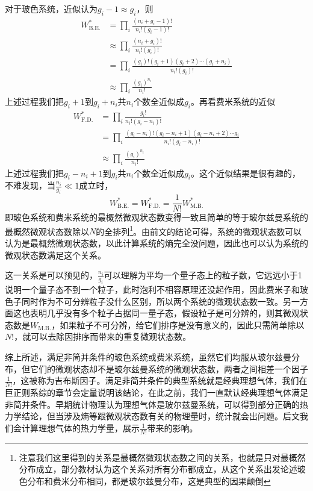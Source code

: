 \documentclass[../../main.tex]{subfiles}
\begin{document}
对于玻色系统，近似认为\(g_i-1\approx g_i\)，则
\begin{equation*}
    \begin{split}
        W_{\mathrm{B.E.}}^*&=\prod_i \frac{(n_i+g_i-1)!}{n_i !(g_i-1)!} \\
        &\approx \prod_i \frac{(n_i+g_i)!}{n_i !(g_i)!} \\
        &=\prod_i \frac{(g_i)!(g_i+1)(g_i+2)\cdots(g_i+n_i)}{n_i !(g_i)!} \\
        &\approx \prod_i \frac{(g_i)^{n_i}}{n_i !}
    \end{split}
\end{equation*}
上述过程我们把\(g_i+1\)到\(g_i+n_i\)共\(n_i\)个数全近似成\(g_i\)。再看费米系统的近似
\begin{equation*}
    \begin{split}
        W_{\mathrm{F.D.}}^*&=\prod_i \frac{g_i !}{n_i !(g_i-n_i)!} \\
        &=\prod_i \frac{(g_i-n_i)!(g_i-n_i+1)(g_i-n_i+2)\cdots g_i}{n_i !(g_i-n_i)!} \\
        &\approx \prod_i \frac{(g_i)^{n_i}}{n_i !}
    \end{split}
\end{equation*}
上述过程我们把\(g_i-n_i+1\)到\(g_i\)共\(n_i\)个数全近似成\(g_i\)。这个近似结果是很有趣的，不难发现，当\(\displaystyle \frac{n_i}{g_i}\ll 1\)成立时，
\begin{equation}
    W_{\mathrm{B.E.}}^*=W_{\mathrm{F.D.}}^*=\frac{1}{N!}W_{\mathrm{M.B.}}^*
\end{equation}
即玻色系统和费米系统的最概然微观状态数变得一致且简单的等于玻尔兹曼系统的最概然微观状态数除以\(N\)的全排列\footnote{注意我们这里得到的关系是最概然微观状态数之间的关系，也就是只对最概然分布成立，部分教材认为这个关系对所有分布都成立，从这个关系出发论述玻色分布和费米分布相同，都是玻尔兹曼分布，这是典型的因果颠倒}。由前文的结论可得，系统的微观状态数可以认为是最概然微观状态数，以此计算系统的熵完全没问题，因此也可以认为系统的微观状态数满足这个关系。

这一关系是可以预见的，\(\displaystyle \frac{n_i}{g_i}\)可以理解为平均一个量子态上的粒子数，它远远小于1说明一个量子态不到一个粒子，此时泡利不相容原理还没起作用，因此费米子和玻色子同时作为不可分辨粒子没什么区别，所以两个系统的微观状态数一致。另一方面这也表明几乎没有多个粒子占据同一量子态，假设粒子是可分辨的，则其微观状态数是\(W_{\mathrm{M.B.}}\)，如果粒子不可分辨，给它们排序是没有意义的，因此只需简单除以\(N!\)，就可以去除因排序而带来的重复微观状态数。

综上所述，满足非简并条件的玻色系统或费米系统，虽然它们均服从玻尔兹曼分布，但它们的微观状态却不是玻尔兹曼系统的微观状态数，两者之间相差一个因子\(\frac{1}{N!}\)，这被称为吉布斯因子。满足非简并条件的典型系统就是经典理想气体，我们在巨正则系综的章节会定量说明该结论，在此之前，我们一直默认经典理想气体满足非简并条件。早期统计物理认为理想气体是玻尔兹曼系统，可以得到部分正确的热力学结论，但当涉及熵等跟微观状态数有关的物理量时，统计就会出问题。后文我们会计算理想气体的热力学量，展示\(\frac{1}{N!}\)带来的影响。
\end{document}
